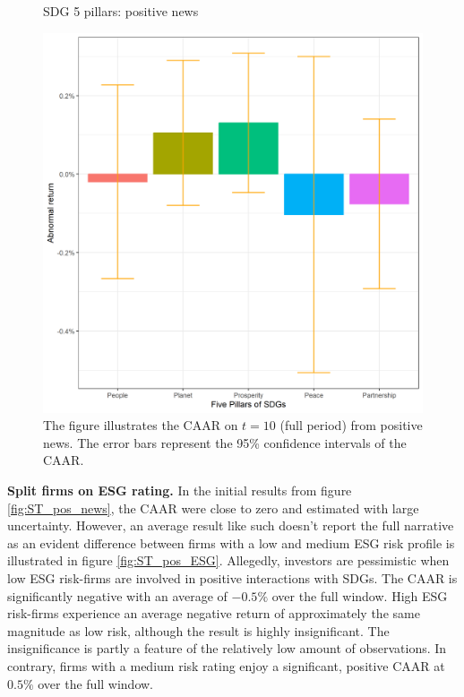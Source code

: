 \begin{figure} [H]
    \centering
    \caption{SDG 5 pillars: positive news}
    \includegraphics[scale=0.6]{Projekt/1.Figures analysis/ST_positive_sdg_bar_groups_0.png}
    \caption*{\footnotesize The figure illustrates the CAAR on $t = 10$ (full period) from positive news. The error bars represent the 95\% confidence intervals of the CAAR.}
    \label{fig:ST_pos_bar}
\end{figure}


\noindent \textbf{Split firms on ESG rating.}
In the initial results from figure \ref{fig:ST_pos_news}, the CAAR were close to zero and estimated with large uncertainty. However, an average result like such doesn't report the full narrative as an evident difference between firms with a low and medium ESG risk profile is illustrated in figure  \ref{fig:ST_pos_ESG}. Allegedly, investors are pessimistic when low ESG risk-firms are involved in positive interactions with SDGs. The CAAR is significantly negative with an average of $-0.5\%$ over the full window. High ESG risk-firms experience an average negative return of approximately the same magnitude as low risk, although the result is highly insignificant. The insignificance is partly a feature of the relatively low amount of observations. In contrary, firms with a medium risk rating enjoy a significant, positive CAAR at $0.5\%$ over the full window. 

